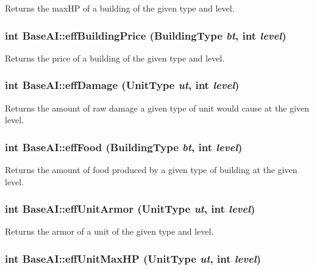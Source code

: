 Returns the maxHP of a building of the given type and level. \hypertarget{classBaseAI_d49ab218e79412c1ce975159688e6cfd}{
\subsubsection[{effBuildingPrice}]{\setlength{\rightskip}{0pt plus 5cm}int BaseAI::effBuildingPrice ({\bf BuildingType} {\em bt}, \/  int {\em level})}}
\label{classBaseAI_d49ab218e79412c1ce975159688e6cfd}


Returns the price of a building of the given type and level. \hypertarget{classBaseAI_0643622ad827a6ad035bf84dfdfacd55}{
\subsubsection[{effDamage}]{\setlength{\rightskip}{0pt plus 5cm}int BaseAI::effDamage ({\bf UnitType} {\em ut}, \/  int {\em level})}}
\label{classBaseAI_0643622ad827a6ad035bf84dfdfacd55}


Returns the amount of raw damage a given type of unit would cause at the given level. \hypertarget{classBaseAI_ec102e33572b1f58df437260bf73141e}{
\subsubsection[{effFood}]{\setlength{\rightskip}{0pt plus 5cm}int BaseAI::effFood ({\bf BuildingType} {\em bt}, \/  int {\em level})}}
\label{classBaseAI_ec102e33572b1f58df437260bf73141e}


Returns the amount of food produced by a given type of building at the given level. \hypertarget{classBaseAI_8606081fe230982963a8cdf820822a19}{
\subsubsection[{effUnitArmor}]{\setlength{\rightskip}{0pt plus 5cm}int BaseAI::effUnitArmor ({\bf UnitType} {\em ut}, \/  int {\em level})}}
\label{classBaseAI_8606081fe230982963a8cdf820822a19}


Returns the armor of a unit of the given type and level. \hypertarget{classBaseAI_0977f4ba22e8b97f89d7b0c03941c788}{
\subsubsection[{effUnitMaxHP}]{\setlength{\rightskip}{0pt plus 5cm}int BaseAI::effUnitMaxHP ({\bf UnitType} {\em ut}, \/  int {\em level})}}
\label{classBaseAI_0977f4ba22e8b97f89d7b0c03941c788}


